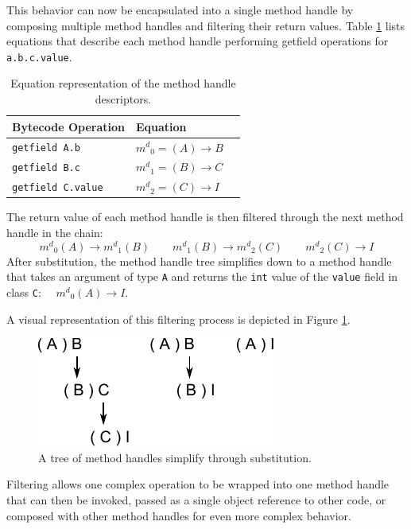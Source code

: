 This behavior can now be encapsulated into a single method handle by composing multiple method handles and filtering their return values.  Table \ref{table:method-handle-descriptor-equations} lists equations that describe each method handle performing getfield operations for \texttt{a.b.c.value}.

\begin{table}[htbp]
  \centering
  \begin{tabular}{ | l | l | p{5cm} |}
  \hline
  \textbf{Bytecode Operation} & \textbf{Equation} \\ \hline
  \texttt{getfield A.b} & ${m^{d}}_0 = (A) \to B$ \\ \hline
  \texttt{getfield B.c} & ${m^{d}}_1 = (B) \to C$ \\ \hline
  \texttt{getfield C.value} & ${m^{d}}_2 = (C) \to I$ \\ \hline
  \end{tabular}
  \caption[\texttt{getfield} Descriptors]{Equation representation of the method handle descriptors.}
  \label{table:method-handle-descriptor-equations}
\end{table}

The return value of each method handle is then filtered through the next method handle in the chain:
\[ {m^{d}}_0(A) \to {m^{d}}_1(B) \qquad
   {m^{d}}_1(B) \to {m^{d}}_2(C) \qquad
   {m^{d}}_2(C) \to I \]
After substitution, the method handle tree simplifies down to a method handle that takes an argument of type \texttt{A} and returns the \texttt{int} value of the \texttt{value} field in class \texttt{C}: $\quad{m^{d}}_0(A) \to I  $.

A visual representation of this filtering process is depicted in Figure \ref{fig:pointer-getfield}.

\smallskip
\begin{figure}[htbp]
  \centering
    \includegraphics{./Figures/pointer-getfield.pdf}
  \caption[Method Handle Composition]{A tree of method handles simplify through substitution.}
	\label{fig:pointer-getfield}
\end{figure}

Filtering allows one complex operation to be wrapped into one method handle that can then be invoked, passed as a single object reference to other code, or composed with other method handles for even more complex behavior.

